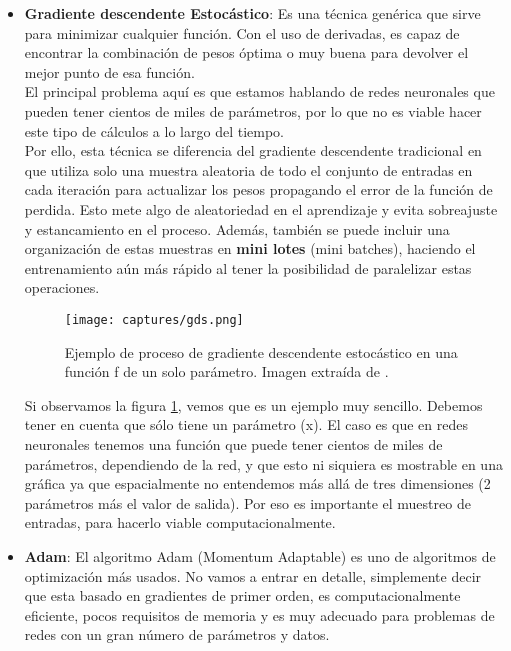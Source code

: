 \documentclass[11pt,fleqn]{book} %
\begin{document}
\begin{itemize}
	\item \textbf{Gradiente descendente Estocástico}: Es una técnica genérica que sirve para minimizar cualquier función. Con el uso de derivadas, es capaz de encontrar la combinación de pesos óptima o muy buena para devolver el mejor punto de esa función. \\
	
	El principal problema aquí es que estamos hablando de redes neuronales que pueden tener cientos de miles de parámetros, por lo que no es viable hacer este tipo de cálculos a lo largo del tiempo. \\
	
	Por ello, esta técnica se diferencia del gradiente descendente tradicional en que utiliza solo una muestra aleatoria de todo el conjunto de entradas en cada iteración para actualizar los pesos propagando el error de la función de perdida. Esto mete algo de aleatoriedad en el aprendizaje y evita sobreajuste y estancamiento en el proceso. Además, también se puede incluir una organización de estas muestras en \textbf{mini lotes} (mini batches), haciendo el entrenamiento aún más rápido al tener la posibilidad de paralelizar estas operaciones.
	
	\begin{figure}[H]
		\centering\texttt{[image: captures/gds.png]}
		\caption{Ejemplo de proceso de gradiente descendente estocástico en una función f de un solo parámetro. Imagen extraída de \cite{article:ejemploGDS}.}
		\label{fig:GDS} %
	\end{figure}

	Si observamos la figura \ref{fig:GDS}, vemos que es un ejemplo muy sencillo. Debemos tener en cuenta que sólo tiene un parámetro (x). El caso es que en redes neuronales tenemos una función que puede tener cientos de miles de parámetros, dependiendo de la red, y que esto ni siquiera es mostrable en una gráfica ya que espacialmente no entendemos más allá de tres dimensiones (2 parámetros más el valor de salida). Por eso es importante el muestreo de entradas, para hacerlo viable computacionalmente. \\

	\item \textbf{Adam}: El algoritmo Adam (Momentum Adaptable) es uno de algoritmos de optimización más usados. No vamos a entrar en detalle, simplemente decir que esta basado en gradientes de primer orden, es computacionalmente eficiente, pocos requisitos de memoria y es muy adecuado para problemas de redes con un gran número de parámetros y datos. \cite{article:adam} \\
\end{itemize}
\end{document}
